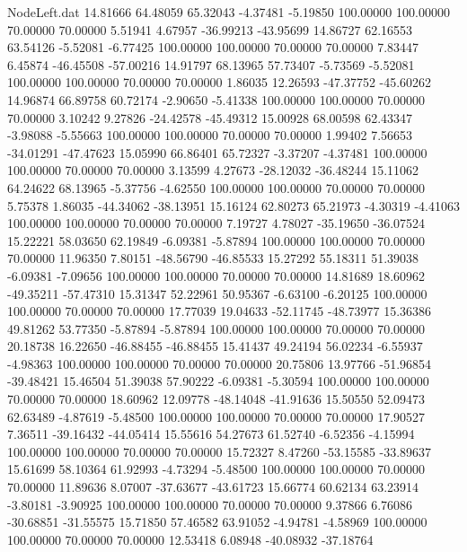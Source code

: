 \begin{filecontents}{NodeLeft.dat}
  14.81666   64.48059   65.32043    -4.37481   -5.19850  100.00000  100.00000   70.00000   70.00000    5.51941    4.67957  -36.99213  -43.95699
  14.86727   62.16553   63.54126    -5.52081   -6.77425  100.00000  100.00000   70.00000   70.00000    7.83447    6.45874  -46.45508  -57.00216
  14.91797   68.13965   57.73407    -5.73569   -5.52081  100.00000  100.00000   70.00000   70.00000    1.86035   12.26593  -47.37752  -45.60262
  14.96874   66.89758   60.72174    -2.90650   -5.41338  100.00000  100.00000   70.00000   70.00000    3.10242    9.27826  -24.42578  -45.49312
  15.00928   68.00598   62.43347    -3.98088   -5.55663  100.00000  100.00000   70.00000   70.00000    1.99402    7.56653  -34.01291  -47.47623
  15.05990   66.86401   65.72327    -3.37207   -4.37481  100.00000  100.00000   70.00000   70.00000    3.13599    4.27673  -28.12032  -36.48244
  15.11062   64.24622   68.13965    -5.37756   -4.62550  100.00000  100.00000   70.00000   70.00000    5.75378    1.86035  -44.34062  -38.13951
  15.16124   62.80273   65.21973    -4.30319   -4.41063  100.00000  100.00000   70.00000   70.00000    7.19727    4.78027  -35.19650  -36.07524
  15.22221   58.03650   62.19849    -6.09381   -5.87894  100.00000  100.00000   70.00000   70.00000   11.96350    7.80151  -48.56790  -46.85533
  15.27292   55.18311   51.39038    -6.09381   -7.09656  100.00000  100.00000   70.00000   70.00000   14.81689   18.60962  -49.35211  -57.47310
  15.31347   52.22961   50.95367    -6.63100   -6.20125  100.00000  100.00000   70.00000   70.00000   17.77039   19.04633  -52.11745  -48.73977
  15.36386   49.81262   53.77350    -5.87894   -5.87894  100.00000  100.00000   70.00000   70.00000   20.18738   16.22650  -46.88455  -46.88455
  15.41437   49.24194   56.02234    -6.55937   -4.98363  100.00000  100.00000   70.00000   70.00000   20.75806   13.97766  -51.96854  -39.48421
  15.46504   51.39038   57.90222    -6.09381   -5.30594  100.00000  100.00000   70.00000   70.00000   18.60962   12.09778  -48.14048  -41.91636
  15.50550   52.09473   62.63489    -4.87619   -5.48500  100.00000  100.00000   70.00000   70.00000   17.90527    7.36511  -39.16432  -44.05414
  15.55616   54.27673   61.52740    -6.52356   -4.15994  100.00000  100.00000   70.00000   70.00000   15.72327    8.47260  -53.15585  -33.89637
  15.61699   58.10364   61.92993    -4.73294   -5.48500  100.00000  100.00000   70.00000   70.00000   11.89636    8.07007  -37.63677  -43.61723
  15.66774   60.62134   63.23914    -3.80181   -3.90925  100.00000  100.00000   70.00000   70.00000    9.37866    6.76086  -30.68851  -31.55575
  15.71850   57.46582   63.91052    -4.94781   -4.58969  100.00000  100.00000   70.00000   70.00000   12.53418    6.08948  -40.08932  -37.18764

\end{filecontents}
